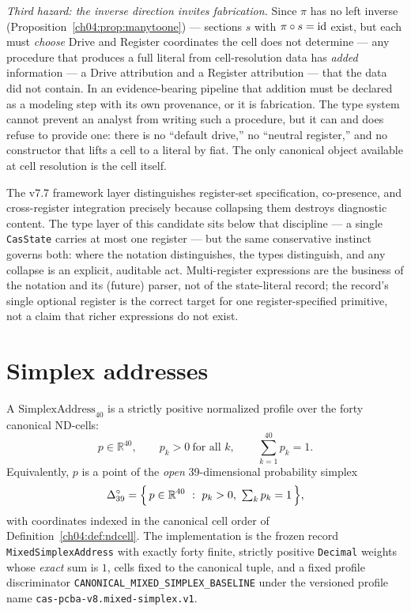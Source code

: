 \emph{Third hazard: the inverse direction invites fabrication.} Since
$\pi$ has no left inverse (Proposition~\ref{ch04:prop:manytoone}) ---
sections $s$ with $\pi \circ s = \mathrm{id}$ exist, but each must \emph{choose}
Drive and Register coordinates the cell does not determine --- any
procedure that produces a full literal from cell-resolution data has
\emph{added} information --- a Drive attribution and a Register attribution
--- that the data did not contain. In an evidence-bearing pipeline that
addition must be declared as a modeling step with its own provenance, or it
is fabrication. The type system cannot prevent an analyst from writing such
a procedure, but it can and does refuse to provide one: there is no
``default drive,'' no ``neutral register,'' and no constructor that lifts a
cell to a literal by fiat. The only canonical object available at cell
resolution is the cell itself.

\begin{remark}
The v7.7 framework layer distinguishes register-set specification,
co-presence, and cross-register integration precisely because collapsing
them destroys diagnostic content. The type layer of this candidate sits
below that discipline --- a single \texttt{CasState} carries at most one
register --- but the same conservative instinct governs both: where the
notation distinguishes, the types distinguish, and any collapse is an
explicit, auditable act. Multi-register expressions are the business of the
notation and its (future) parser, not of the state-literal record; the
record's single optional register is the correct target for one
register-specified primitive, not a claim that richer expressions do not
exist.
\end{remark}

\section{Simplex addresses}\label{ch04:sec:simplex}

\begin{definition}[SimplexAddress40]\label{ch04:def:simplex}
A $\mathrm{SimplexAddress}_{40}$ is a strictly positive normalized profile
over the forty canonical ND-cells:
\[
p \in \mathbb{R}^{40},
\qquad p_k > 0 \ \text{for all } k,
\qquad \sum_{k=1}^{40} p_k = 1 .
\]
Equivalently, $p$ is a point of the \emph{open} 39-dimensional probability
simplex
\[
\Delta_{39}^{\circ}
 = \Bigl\{\, p \in \mathbb{R}^{40} \ :\ p_k > 0,\ \textstyle\sum_k p_k = 1 \,\Bigr\},
\]
with coordinates indexed in the canonical cell order of
Definition~\ref{ch04:def:ndcell}. The implementation is the frozen record
\texttt{MixedSimplexAddress} with exactly forty finite, strictly positive
\texttt{Decimal} weights whose \emph{exact} sum is $1$, cells fixed to the
canonical tuple, and a fixed profile discriminator
\texttt{CANONICAL\_MIXED\_SIMPLEX\_BASELINE} under the versioned profile
name \texttt{cas-pcba-v8.mixed-simplex.v1}.
\end{definition}

